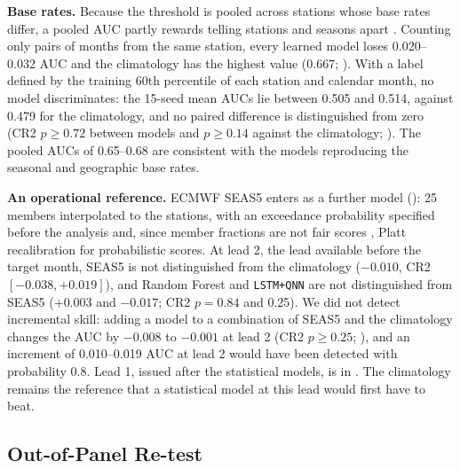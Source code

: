 \documentclass[11pt,a4paper]{article}
\begin{document}
\textbf{Base rates.}\label{sec:stationmonth} Because the threshold is pooled across stations whose base rates differ, a pooled AUC partly rewards telling stations and seasons apart \citep{hamill2006}. Counting only pairs of months from the same station, every learned model loses 0.020--0.032 AUC and the climatology has the highest value (0.667; ). With a label defined by the training 60th percentile of each station and calendar month, no model discriminates: the 15-seed mean AUCs lie between 0.505 and 0.514, against 0.479 for the climatology, and no paired difference is distinguished from zero (CR2 $p\ge0.72$ between models and $p\ge0.14$ against the climatology; ). The pooled AUCs of 0.65--0.68 are consistent with the models reproducing the seasonal and geographic base rates.

\textbf{An operational reference.}\label{sec:seas5} ECMWF SEAS5 \citep{johnson2019seas5,c3s_seasonal_monthly} enters as a further model (): 25 members interpolated to the stations, with an exceedance probability specified before the analysis and, since member fractions are not fair scores \citep{ferro2014}, Platt recalibration for probabilistic scores. At lead 2, the lead available before the target month, SEAS5 is not distinguished from the climatology ($-0.010$, CR2 $[-0.038,+0.019]$), and Random Forest and \texttt{LSTM+QNN} are not distinguished from SEAS5 ($+0.003$ and $-0.017$; CR2 $p=0.84$ and 0.25). We did not detect incremental skill: adding a model to a combination of SEAS5 and the climatology changes the AUC by $-0.008$ to $-0.001$ at lead 2 (CR2 $p\ge0.25$; ), and an increment of 0.010--0.019 AUC at lead 2 would have been detected with probability 0.8. Lead 1, issued after the statistical models, is in . The climatology remains the reference that a statistical model at this lead would first have to beat.

\subsection{Out-of-Panel Re-test}
\label{sec:replication}
\end{document}
